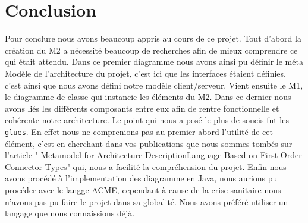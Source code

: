 \documentclass[11pt, a4paper, notitlepage]{article}
\newcommand\tab{\hspace*{10mm}}
\begin{document}
\section*{Conclusion}
\tab Pour conclure nous avons beaucoup appris au cours de ce projet. Tout d'abord la création du M2 a nécessité beaucoup de recherches afin de mieux comprendre ce qui était attendu. Dans ce premier diagramme nous avons ainsi pu définir le méta Modèle de l'architecture du projet, c'est ici que les interfaces étaient définies, c'est ainsi que nous avons défini notre modèle client/serveur. Vient ensuite le M1, le diagramme de classe qui instancie les éléments du M2. Dans ce dernier nous avons liés les différents composants entre eux afin de rentre fonctionnelle et cohérente notre architecture. Le point qui nous a posé le plus de soucis fut les \verb"glues". En effet nous ne comprenions pas au premier abord l'utilité de cet élément, c'est en cherchant dans vos publications que nous sommes tombés sur l'article " Metamodel for Architecture DescriptionLanguage Based on First-Order Connector Types" qui, nous a facilité la compréhension du projet. Enfin nous avons procédé à l'implementation des diagramme en Java, nous aurions pu procéder avec le langge ACME, cependant à cause de la crise sanitaire nous n'avons pas pu faire le projet dans sa globalité. Nous avons préféré utiliser un langage que nous connaissions déjà.
\end{document}
